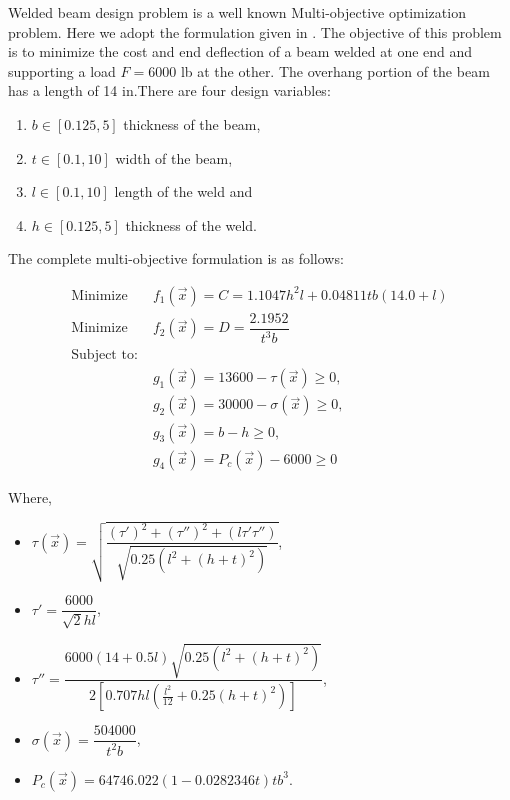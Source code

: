 Welded beam design problem is a well known Multi-objective optimization
problem. Here we adopt the formulation given in \citep{deb10}. The
objective of this problem is to minimize the cost and end deflection of a
beam welded at one end and supporting a load $ F = 6000$ lb at the other.
The overhang portion of the beam has a length of 14 in.There are four
design variables:
\begin{enumerate}
  \item $b \in [0.125, 5] $ thickness of the beam,
  \item $t \in [0.1, 10] $ width of the beam,
  \item $l \in [0.1, 10] $ length of the weld and
  \item $h \in [0.125, 5] $ thickness of the weld.
\end{enumerate}

The complete multi-objective formulation is as follows:

\begin{singlespacing}
  \begin{align}
    \text{Minimize} \quad &f_1(\vec{x}) = C = \left. 1.1047 h ^2 l + 0.04811 t b(14.0 + l) \right. \\
    \text{Minimize} \quad &f_2(\vec{x}) = D = \left. \dfrac{2.1952}{t^3 b} \right. \\
  \text{Subject to:}  & \nonumber \\
  \qquad &g_1(\vec{x}) = \left. 13600 - \tau (\vec{x}) \geqslant 0 \right. ,\\
  \qquad &g_2(\vec{x}) = \left. 30000 - \sigma (\vec{x}) \geqslant 0 \right.,\\
  \qquad &g_3(\vec{x}) = \left. b - h \geqslant 0 \right., \\
  \qquad &g_4(\vec{x}) = \left. P_c(\vec{x}) - 6000 \geqslant 0 \right. 
\end{align}


Where,

\begin{itemize}
  \item $ \tau (\vec{x}) = \sqrt{ \dfrac{(\tau ')^2 + (\tau'')^2 + (l \tau' \tau'')} {\sqrt{ 0.25(l^2 + (h + t)^2)}}}$,
  \item $ \tau' = \dfrac {6000} {\sqrt{2} h l}$,
  \item $ \tau'' = \dfrac { 6000 (14 + 0.5l) \sqrt{0.25(l^2 + (h + t) ^2 )}} { 2 [0.707 h l (\frac{l^2}{12} + 0.25 (h + t) ^2)] } $,
  \item $ \sigma (\vec{x}) = \dfrac {504000} {t^2 b} $,
  \item $P_c (\vec{x}) = 64746.022(1-0.0282346t) t b^3$.
\end{itemize}

\end{singlespacing}    

